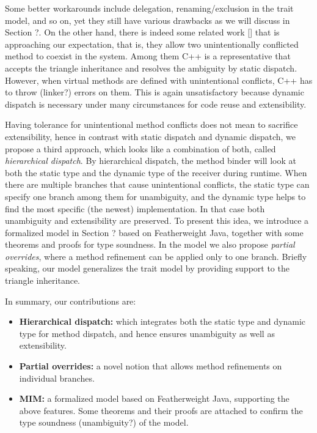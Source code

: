 Some better workarounds include delegation, renaming/exclusion in the trait model, and so on, yet they still have various drawbacks as we will discuss in Section ?. On the other hand, there is indeed some related work [] that is approaching our expectation, that is, they allow two unintentionally conflicted method to coexist in the system. Among them C++ is a representative that accepts the triangle inheritance and resolves the ambiguity by static dispatch. However, when virtual methods are defined with unintentional conflicts, C++ has to throw (linker?) errors on them.
This is again unsatisfactory because dynamic dispatch is necessary under many circumstances for code reuse and extensibility.

Having tolerance for unintentional method conflicts does not mean to sacrifice extensibility, hence in contrast with static dispatch and dynamic dispatch, we propose a third approach, which looks like a combination of both, called \textit{hierarchical dispatch}. By hierarchical dispatch, the method binder will look at both the static type and the dynamic type of the receiver during runtime. When there are multiple branches that cause unintentional conflicts, the static type can specify one branch among them for unambiguity, and the dynamic type helps to find the most specific (the newest) implementation. In that case both unambiguity and extensibility are preserved. To present this idea, we introduce a formalized model in Section ? based on Featherweight Java, together with some theorems and proofs for type soundness. In the model we also propose \textit{partial overrides}, where a method refinement can be applied only to one branch. Briefly speaking, our model generalizes the trait model by providing support to the triangle inheritance.

In summary, our contributions are: 
\begin{itemize}
	\item \textbf{Hierarchical dispatch:} which integrates both the static type and dynamic type for method dispatch, and hence
	ensures unambiguity as well as extensibility.
	\item \textbf{Partial overrides:} a novel notion that allows method refinements on individual branches.
	\item \textbf{MIM:} a formalized model based on Featherweight Java, supporting the above features. Some theorems and their proofs
	are attached to confirm the type soundness (unambiguity?) of the model.
\end{itemize}

 